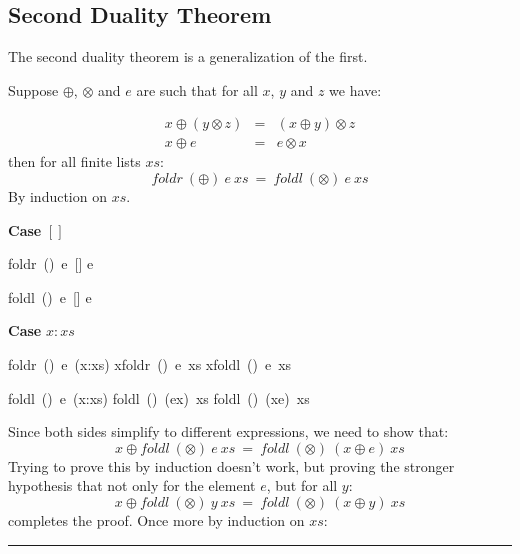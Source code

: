 \documentclass[twoside]{article}
\newenvironment{proof}{{\bf Proof:}}{\hfill\rule{2mm}{2mm}}
\begin{document}
\subsection{Second Duality Theorem}
The second duality theorem is a generalization of the first.

Suppose $\oplus$, $\otimes$ and $e$ are such that for all $x$, $y$ and
$z$ we have:

\[
\begin{array}{rcl}
  x\oplus(y\otimes z) & = &  (x\oplus y)\otimes z \\
  x\oplus e & = & e \otimes x
\end{array}
\]
then for all finite lists $xs$:
$$foldr~(\oplus)~e~xs~=~foldl~(\otimes)~e~xs$$
\begin{proof} 
By induction on $xs$.

\textbf{Case} $[]$ 

\begin{minipage}{0.4\textwidth}
\begin{calculation}
  foldr~(\oplus)~e~[]
  e
\end{calculation}
\end{minipage}%
\begin{minipage}{0.4\textwidth}
\begin{calculation}
  foldl~(\otimes)~e~[]
  e
\end{calculation}
\end{minipage}

\textbf{Case} $x:xs$

\begin{minipage}{0.5\textwidth}
\begin{calculation}
  foldr~(\oplus)~e~(x:xs)
  x\oplus foldr~(\oplus)~e~xs
  x\oplus foldl~(\otimes)~e~xs
\end{calculation}
\end{minipage}%
\begin{minipage}{0.4\textwidth}
\begin{calculation}
  foldl~(\otimes)~e~(x:xs)
  foldl~(\otimes)~(e\otimes x)~xs
  foldl~(\otimes)~(x\oplus e)~xs
\end{calculation}
\end{minipage}
\newline

Since both sides simplify to different expressions, we need to show that: 
  $$x\oplus foldl~(\otimes)~e~xs~=~foldl~(\otimes)~(x\oplus e)~xs$$
Trying to prove this by induction doesn't work, but proving the stronger
  hypothesis that not only for the element $e$, but for all $y$:
  $$x\oplus foldl~(\otimes)~y~xs~=~foldl~(\otimes)~(x\oplus y)~xs$$
completes the proof. Once more by induction on $xs$:


\end{proof}
\end{document}
